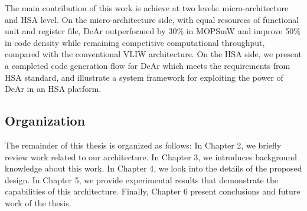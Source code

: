 \documentclass[12pt]{article}
\begin{document}
\begin{CJK}{UTF8}{bkai}
        The main contribution of this work is achieve at two levels: micro-architecture and HSA level. 
        On the micro-architecture side, with equal resources of functional unit and register file, DeAr outperformed by 30\% in MOPS\/mW and improve 50\% in code density while remaining competitive computational throughput, compared with the conventional VLIW architecture.
        On the HSA side, we present a completed code generation flow for DeAr which meets the requirements from HSA standard, and illustrate a system framework for exploiting the power of DeAr in an HSA platform.
 
    \subsection{Organization}
        The remainder of this thesis is organized as follows: In Chapter 2, we briefly review work related to our architecture. In Chapter 3, we introduces background knowledge about this work. In Chapter 4, we look into the details of the proposed design. In Chapter 5, we provide experimental results that demonstrate the capabilities of this architecture. Finally, Chapter 6 present conclusions and future work of the thesis.

\newpage


\end{CJK}
\end{document}

